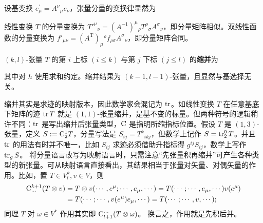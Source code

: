 
\begin{theorem}
    设基变换 $e_\mu^{\prime}=A^\nu{ }_\mu e_\nu$，张量分量的变换律显然为
\end{theorem}
\begin{example}
    线性变换 $T$ 的分量变换为 $T'^\mu{}_\nu= (A^{-1})^\mu{}_\rho T^\rho{}_\sigma A^\sigma{}_\nu$，即分量矩阵相似。双线性函数的分量变换为 $f'_{\mu\nu}=(A^\mathrm{T})_\mu{}^\rho f_{\rho\sigma} A^\sigma{}_\nu$，即分量矩阵合同。
\end{example}

\begin{definition}
    $(k,l)$-张量 $ T $ 的第 $i$ 上标 $(i \leqslant k)$ 与第 $j$ 下标 $(j \leqslant l)$ 的\textbf{缩并}为
\vspace{-0.1\baselineskip}

\noindent 其中对 $h$ 使用求和约定。缩并结果为 $(k-1,l-1)$-张量，且显然与基选择无关。
\end{definition}

缩并其实是求迹的映射版本，因此数学家会混记为 $\tr$。如线性变换 $T$ 在任意基底下矩阵的迹 $\tr T$ 就是 $(1,1)$-张量缩并，是基不变的标量。但两种符号的逻辑稍许不同：$\tr$ 是写出缩并后张量类型，$\mathrm{C}$ 是指明所缩指标位置。假设 $T$ 是 $(1,3)$-张量，定义 $S:=\mathrm{C}_2^1T$，分量写法是 $S_{ij}=T^{k}{}_{ikj}$，但数学上记作 $S=\tr^0_2 T$。并且 $\tr$ 的用法有时并不唯一，比如 $S_{ij}$ 求迹必须借助升指标得 $g^{ij}S_{ij}$，数学上写作 $\tr_{g}S$。
将分量语言改写为映射语言时，只需注意“先张量积再缩并”可产生各种类型的新张量。可从映射语言直接看出，其结果相当于张量对矢量、对偶矢量的作用。比如，置 $T \in V^k_l,v \in V$，则
\begin{align*}
    \mathrm{C}_{\cdots}^{k+1}(T \otimes v)&=T \otimes v(\cdots,e^{\mu} ; \cdots,e_{\mu},\cdots)=T(\cdots;\cdots,e_{\mu},\cdots)v(e^\mu)\\
    &=T(\cdots;\cdots,v(e^\mu)e_{\mu},\cdots)=T(\cdots;\cdots,v,\cdots);
\end{align*}
同理 $T$ 对 $\omega\in V^*$ 作用其实即 $\mathrm{C}_{l+1}^{\cdots}(T \otimes \omega)$。
换言之，作用就是先积后并。

